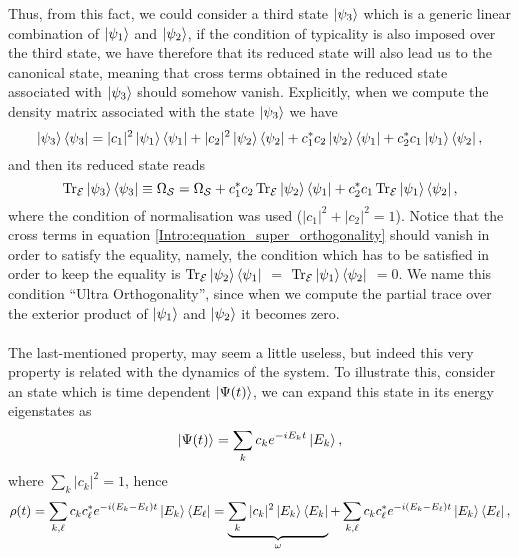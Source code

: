 Thus, from this fact, we could consider a third state $\mathinner{|{\psi_3}\rangle}$ which is a generic linear combination of $\mathinner{|{\psi_1}\rangle}$ and $\mathinner{|{\psi_2}\rangle}$, if the condition of typicality is also imposed over the third state, we have therefore that its reduced state will also lead us to the canonical state, meaning that cross terms obtained in the reduced state associated with $\mathinner{|{\psi_3}\rangle}$ should somehow vanish. Explicitly, when we compute the density matrix associated with the state $\mathinner{|{\psi_3}\rangle}$ we have 
\begin{equation}
\mathinner{|{\psi_3}\rangle}\mathinner{\langle{\psi_3}|} = |c_1|^2 \mathinner{|{\psi_1}\rangle}\mathinner{\langle{\psi_1}|} + |c_2|^2 \mathinner{|{\psi_2}\rangle}\mathinner{\langle{\psi_2}|}+c_1^*c_2\mathinner{|{\psi_2}\rangle}\mathinner{\langle{\psi_1}|} + c_2^*c_1\mathinner{|{\psi_1}\rangle}\mathinner{\langle{\psi_2}|},
\end{equation}
and then its reduced state reads
\begin{equation}
\operatorname{Tr}_{\mathcal{E}}\mathinner{|{\psi_3}\rangle}\mathinner{\langle{\psi_3}|} \equiv \Omega_{\mathcal{S}}= \Omega_{\mathcal{S}}+c_1^*c_2\operatorname{Tr}_{\mathcal{E}}\mathinner{|{\psi_2}\rangle}\mathinner{\langle{\psi_1}|} + c_2^*c_1\operatorname{Tr}_{\mathcal{E}}\mathinner{|{\psi_1}\rangle}\mathinner{\langle{\psi_2}|},
\label{Intro:equation_super_orthogonality}
\end{equation}
where the condition of normalisation was used ($|c_1|^2 + |c_2|^2 =1$). Notice that the cross terms in equation \eqref{Intro:equation_super_orthogonality} should vanish in order to satisfy the equality, namely, the condition which has to be satisfied in order to keep the equality is $\operatorname{Tr}_{\mathcal{E}}\mathinner{|{\psi_2}\rangle}\mathinner{\langle{\psi_1}|}$ $=$ $\operatorname{Tr}_{\mathcal{E}}\mathinner{|{\psi_1}\rangle}\mathinner{\langle{\psi_2}|}$ $=0$.  We name this condition ``Ultra Orthogonality'', since when we compute the partial trace over the exterior product of $\mathinner{|{\psi_1}\rangle}$ and $\mathinner{|{\psi_2}\rangle}$ it becomes zero.\\\\
\indent The last-mentioned property, may seem a little useless, but indeed this very property is related with the dynamics of the system. To illustrate this, consider an state which is time dependent $\mathinner{|{\Psi(t)}\rangle}$, we can expand this state in its energy eigenstates as
\begin{equation}
\mathinner{|{\Psi(t)}\rangle}=\sum_{k} c_k e^{-iE_kt}\mathinner{|{E_k}\rangle},
\end{equation}
where $\sum_k|c_k|^2=1$, hence
\begin{equation}
\rho(t) = \sum_{ k,\ell}c_kc^*_\ell e^{-i(E_k-E_\ell)t}\mathinner{|{E_k}\rangle}\mathinner{\langle{E_\ell}|} = \underbrace{\sum_{ k}|c_k|^2 \mathinner{|{E_k}\rangle}\mathinner{\langle{E_k}|}}_{\omega}+\sum_{ k,\ell}c_kc^*_\ell e^{-i(E_k-E_\ell)t}\mathinner{|{E_k}\rangle}\mathinner{\langle{E_\ell}|},
\end{equation}
